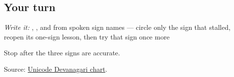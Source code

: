\subsection*{Your turn}
\emph{Write it:} \textbf{}, \textbf{}, and \textbf{} from spoken sign names — circle only the sign that stalled, reopen its one-sign lesson, then try that sign once more

\begin{tcolorbox}[breakable,colback=teal!4,colframe=teal!35!black,title={Before you move on}]
Stop after the three signs are accurate.

Source: \href{https://www.unicode.org/charts/PDF/U0900.pdf}{Unicode Devanagari chart}.
\end{tcolorbox}

